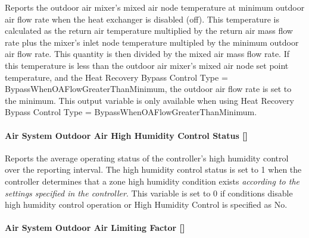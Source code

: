 Reports the outdoor air mixer's mixed air node temperature at minimum outdoor air flow rate when the heat exchanger is disabled (off). This temperature is calculated as the return air temperature multiplied by the return air mass flow rate plus the mixer's inlet node temperature multipled by the minimum outdoor air flow rate. This quantity is then divided by the mixed air mass flow rate. If this temperature is less than the outdoor air mixer's mixed air node set point temperature, and the Heat Recovery Bypass Control Type = BypassWhenOAFlowGreaterThanMinimum, the outdoor air flow rate is set to the minimum. This output variable is only available when using Heat Recovery Bypass Control Type = BypassWhenOAFlowGreaterThanMinimum.

\paragraph{Air System Outdoor Air High Humidity Control Status {[]}}\label{air-system-outdoor-air-high-humidity-control-status}

Reports the average operating status of the controller's high humidity control over the reporting interval. The high humidity control status is set to 1 when the controller determines that a zone high humidity condition exists \emph{according to the settings specified in the controller}. This variable is set to 0 if conditions disable high humidity control operation or High Humidity Control is specified as No.

\paragraph{Air System Outdoor Air Limiting Factor {[]}}\label{air-system-outdoor-air-limiting-factor}

